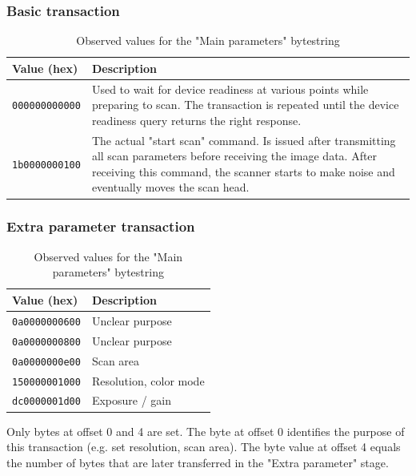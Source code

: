 \documentclass{article}
\begin{document}
\subsubsection{Basic transaction}
\label{appendix_basic}

\begin{table}[H]
  \caption{Observed values for the "Main parameters" bytestring}
  \centering
  \begin{tabularx}{\textwidth}{l | X}
    Value (hex) & Description \\ \hline
    {\tt 000000000000} & Used to wait for device readiness at various points while preparing to scan. The transaction is repeated
                         until the device readiness query returns the right response.
                         \\
    {\tt 1b0000000100} & The actual "start scan" command. Is issued after transmitting all scan parameters
                         before receiving the image data. After receiving this command, the scanner
                         starts to make noise and eventually moves the scan head. \\
  \end{tabularx}
\end{table}

\subsubsection{Extra parameter transaction}
\label{appendix_extra}

\begin{table}[H]
  \caption{Observed values for the "Main parameters" bytestring}
  \centering
  \begin{tabularx}{\textwidth}{l | X}
    Value (hex) & Description \\ \hline
    {\tt 0a0000000600} & Unclear purpose \\
    {\tt 0a0000000800} & Unclear purpose \\
    {\tt 0a0000000e00} & Scan area \\
    {\tt 150000001000} & Resolution, color mode \\
    {\tt dc0000001d00} & Exposure / gain \\
  \end{tabularx}
\end{table}

Only bytes at offset 0 and 4 are set. The byte at offset 0 identifies the
purpose of this transaction (e.g. set resolution, scan area). The byte value at offset 4 equals
the number of bytes that are later transferred in the "Extra parameter"
stage.
\end{document}
